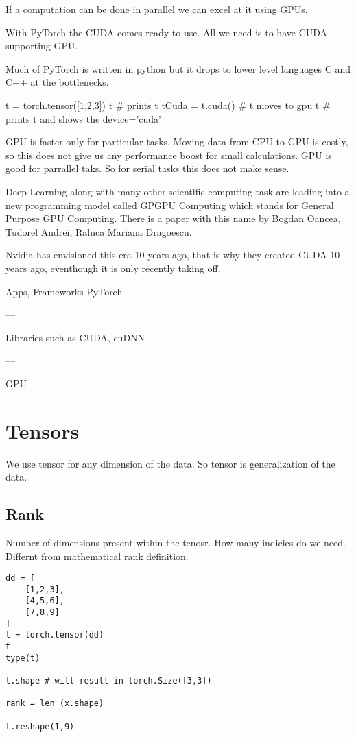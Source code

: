 \documentclass[11pt,twoside,a4paper]{report}
\begin{document}
If a computation can be done in parallel we can excel at it using GPUs.

With PyTorch the CUDA comes ready to use. All we need is to have CUDA supporting GPU.

Much of PyTorch is written in python but it drops to lower level languages C and C++ at the bottlenecks.


t = torch.tensor([1,2,3])
t \# prints t
tCuda = t.cuda() \# t moves to gpu
t \# prints t and shows the device='cuda'



GPU is faster only for particular tasks. Moving data from CPU to GPU is costly, so this does not give us any performance boost for small calculations.
GPU is good for parrallel taks. So for serial tasks this does not make sense.

Deep Learning along with many other scientific computing task are leading into a new programming model called GPGPU Computing which stands for General Purpose
GPU Computing. There is a paper with this name by Bogdan Oancea, Tudorel Andrei, Raluca Mariana Dragoescu.

Nvidia has envisioned this era 10 years ago, that is why they created CUDA 10 years ago, eventhough it is only recently taking off. 


Apps, Frameworks
PyTorch

---

Libraries such as CUDA, cuDNN

---

GPU

\chapter{Tensors}
We use tensor for any dimension of the data. So tensor is generalization of the data.

\section{Rank}
Number of dimensions present within the tenosr. How many indicies do we need. Differnt from mathematical rank definition.

\begin{lstlisting}
dd = [
    [1,2,3],
    [4,5,6],
    [7,8,9]
]
t = torch.tensor(dd)
t
type(t)

t.shape # will result in torch.Size([3,3])

rank = len (x.shape)

t.reshape(1,9)
\end{lstlisting}
\end{document}
